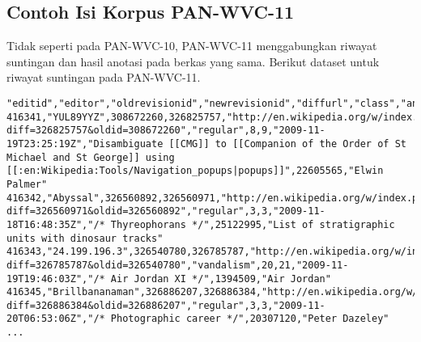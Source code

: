\newpage
\subsection{Contoh Isi Korpus PAN-WVC-11}

Tidak seperti pada PAN-WVC-10, PAN-WVC-11 menggabungkan riwayat suntingan dan hasil anotasi pada berkas yang sama.
Berikut dataset untuk riwayat suntingan pada PAN-WVC-11.

\begin{lstlisting}
"editid","editor","oldrevisionid","newrevisionid","diffurl","class","annotators","totalannotators","edittime","editcomment","articleid","articletitle"
416341,"YUL89YYZ",308672260,326825757,"http://en.wikipedia.org/w/index.php?diff=326825757&oldid=308672260","regular",8,9,"2009-11-19T23:25:19Z","Disambiguate [[CMG]] to [[Companion of the Order of St Michael and St George]] using [[:en:Wikipedia:Tools/Navigation_popups|popups]]",22605565,"Elwin Palmer"
416342,"Abyssal",326560892,326560971,"http://en.wikipedia.org/w/index.php?diff=326560971&oldid=326560892","regular",3,3,"2009-11-18T16:48:35Z","/* Thyreophorans */",25122995,"List of stratigraphic units with dinosaur tracks"
416343,"24.199.196.3",326540780,326785787,"http://en.wikipedia.org/w/index.php?diff=326785787&oldid=326540780","vandalism",20,21,"2009-11-19T19:46:03Z","/* Air Jordan XI */",1394509,"Air Jordan"
416345,"Brillbananaman",326886207,326886384,"http://en.wikipedia.org/w/index.php?diff=326886384&oldid=326886207","regular",3,3,"2009-11-20T06:53:06Z","/* Photographic career */",20307120,"Peter Dazeley"
...
\end{lstlisting}

\clearpage
\printbibliography


